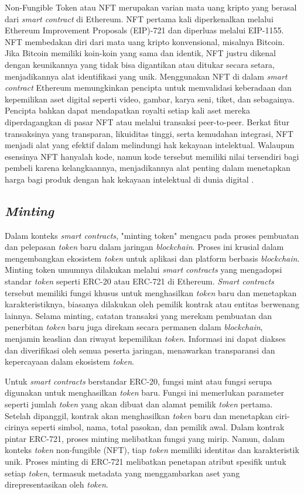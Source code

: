 Non-Fungible Token atau NFT merupakan varian mata uang kripto yang berasal dari \emph{smart contract} di Ethereum. NFT pertama kali diperkenalkan melalui Ethereum Improvement Proposals (EIP)-721 dan diperluas melalui EIP-1155. NFT membedakan diri dari mata uang kripto konvensional, misalnya Bitcoin. Jika Bitcoin memiliki koin-koin yang sama dan identik, NFT justru dikenal dengan keunikannya yang tidak bisa digantikan atau ditukar secara setara, menjadikannya alat identifikasi yang unik. Menggunakan NFT di dalam \emph{smart contract} Ethereum memungkinkan pencipta untuk memvalidasi keberadaan dan kepemilikan aset digital seperti video, gambar, karya seni, tiket, dan sebagainya. Pencipta bahkan dapat mendapatkan royalti setiap kali aset mereka diperdagangkan di pasar NFT atau melalui transaksi peer-to-peer. Berkat fitur transaksinya yang transparan, likuiditas tinggi, serta kemudahan integrasi, NFT menjadi alat yang efektif dalam melindungi hak kekayaan intelektual. Walaupun esensinya NFT hanyalah kode, namun kode tersebut memiliki nilai tersendiri bagi pembeli karena kelangkaannya, menjadikannya alat penting dalam menetapkan harga bagi produk dengan hak kekayaan intelektual di dunia digital \cite{Wang2021}.

\subsection{\emph{Minting}}
Dalam konteks \emph{smart contracts}, "minting token" mengacu pada proses pembuatan dan pelepasan \emph{token} baru dalam jaringan \emph{blockchain}. Proses ini krusial dalam mengembangkan ekosistem \emph{token} untuk aplikasi dan platform berbasis \emph{blockchain}. Minting token umumnya dilakukan melalui \emph{smart contracts} yang mengadopsi standar \emph{token} seperti ERC-20 atau ERC-721 di Ethereum. \emph{Smart contracts} tersebut memiliki fungsi khusus untuk menghasilkan \emph{token} baru dan menetapkan karakteristiknya, biasanya dilakukan oleh pemilik kontrak atau entitas berwenang lainnya. Selama minting, catatan transaksi yang merekam pembuatan dan penerbitan \emph{token} baru juga direkam secara permanen dalam \emph{blockchain}, menjamin keaslian dan riwayat kepemilikan \emph{token}. Informasi ini dapat diakses dan diverifikasi oleh semua peserta jaringan, menawarkan transparansi dan kepercayaan dalam ekosistem \emph{token}. 

Untuk \emph{smart contracts} berstandar ERC-20, fungsi mint atau fungsi serupa digunakan untuk menghasilkan \emph{token} baru. Fungsi ini memerlukan parameter seperti jumlah \emph{token} yang akan dibuat dan alamat pemilik \emph{token} pertama. Setelah dipanggil, kontrak akan menghasilkan \emph{token} baru dan menetapkan ciri-cirinya seperti simbol, nama, total pasokan, dan pemilik awal. Dalam kontrak pintar ERC-721, proses minting melibatkan fungsi yang mirip. Namun, dalam konteks \emph{token} non-fungible (NFT), tiap \emph{token} memiliki identitas dan karakteristik unik. Proses minting di ERC-721 melibatkan penetapan atribut spesifik untuk setiap \emph{token}, termasuk metadata yang menggambarkan aset yang direpresentasikan oleh \emph{token}. 

